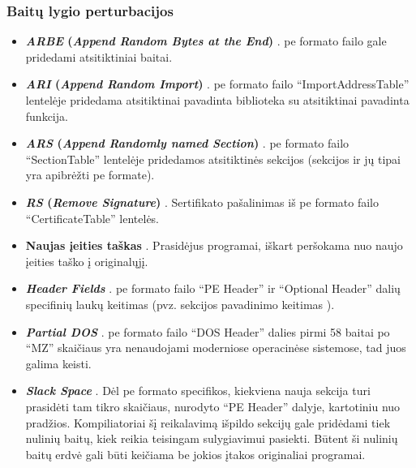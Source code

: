 \subsubsection{Baitų lygio perturbacijos}\label{sec:literature:perturbations:byte}
\begin{itemize}
    \item \textbf{\textit{ARBE} (\textit{Append Random Bytes at the End})} \cite{fangEvadingMalwareEngines2019}. \acs{pe} formato failo gale pridedami atsitiktiniai baitai.
    \item \textbf{\textit{ARI} (\textit{Append Random Import})} \cite{fangEvadingMalwareEngines2019}. \acs{pe} formato failo \enquote{ImportAddressTable} lentelėje pridedama atsitiktinai pavadinta biblioteka su atsitiktinai pavadinta funkcija.
    \item \textbf{\textit{ARS} (\textit{Append Randomly named Section})} \cite{fangEvadingMalwareEngines2019}. \acs{pe} formato failo \enquote{SectionTable} lentelėje pridedamos atsitiktinės sekcijos (sekcijos ir jų tipai yra apibrėžti \acs{pe} formate).
    \item \textbf{\textit{RS} (\textit{Remove Signature})} \cite{fangEvadingMalwareEngines2019}. Sertifikato pašalinimas iš \acs{pe} formato failo \enquote{CertificateTable} lentelės.
    \item \textbf{Naujas įeities taškas} \cite{andersonLearningEvadeStatic2018}. Prasidėjus programai, iškart peršokama nuo naujo įeities taško į originalųjį.
    \item \textbf{\textit{Header Fields}} \cite{demetrioAdversarialEXEmplesSurvey2021}. \acs{pe} formato failo \enquote{PE Header} ir \enquote{Optional Header} dalių specifinių laukų keitimas (pvz. sekcijos pavadinimo keitimas \cite{andersonLearningEvadeStatic2018}).
    \item \textbf{\textit{Partial DOS}} \cite{demetrioAdversarialEXEmplesSurvey2021}. \acs{pe} formato failo \enquote{DOS Header} dalies pirmi 58 baitai po \enquote{MZ} skaičiaus yra nenaudojami moderniose operacinėse sistemose, tad juos galima keisti.
    \item \textbf{\textit{Slack Space}} \cite{demetrioAdversarialEXEmplesSurvey2021}. Dėl \acs{pe} formato specifikos, kiekviena nauja sekcija turi prasidėti tam tikro skaičiaus, nurodyto \enquote{PE Header} dalyje, kartotiniu nuo pradžios. Kompiliatoriai šį reikalavimą išpildo sekcijų gale pridėdami tiek nulinių baitų, kiek reikia teisingam sulygiavimui pasiekti. Būtent ši nulinių baitų erdvė gali būti keičiama be jokios įtakos originaliai programai.

\end{itemize}
